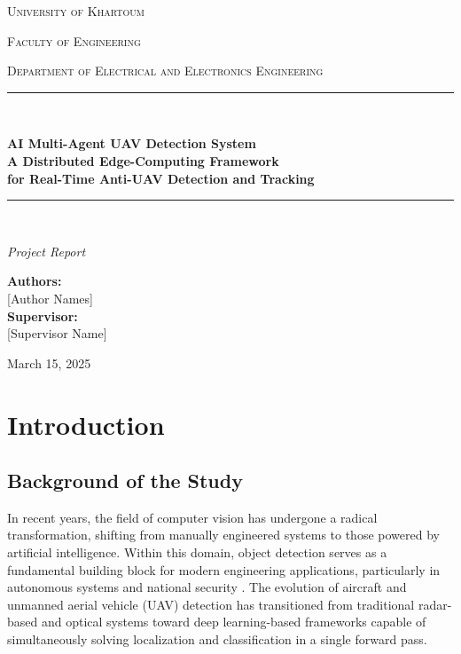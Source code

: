 \documentclass[12pt,a4paper]{report}
\begin{document}
\begin{titlepage}
  \centering
  \vspace*{2cm}
  {\scshape\LARGE University of Khartoum \par}
  \vspace{0.4cm}
  {\scshape\large Faculty of Engineering \par}
  \vspace{0.2cm}
  {\scshape\large Department of Electrical and Electronics Engineering \par}
  \vspace{3cm}
  \rule{\linewidth}{0.5mm}\\[0.4cm]
  {\huge\bfseries AI Multi-Agent UAV Detection System\\[0.4cm]
  A Distributed Edge-Computing Framework\\[0.3cm]
  for Real-Time Anti-UAV Detection and Tracking\par}
  \rule{\linewidth}{0.5mm}\\[1.5cm]
  \vspace{1cm}
  {\Large\itshape Project Report\par}
  \vspace{2cm}
  {\large
    \textbf{Authors:}\\[0.3cm]
    [Author Names]\\[0.5cm]
    \textbf{Supervisor:}\\[0.3cm]
    [Supervisor Name]\\[1cm]
  }
  \vfill
  {\large March 15, 2025\par}
\end{titlepage}

\tableofcontents
\newpage

\chapter{Introduction}

\section{Background of the Study}

In recent years, the field of computer vision has undergone a radical transformation,
shifting from manually engineered systems to those powered by artificial intelligence.
Within this domain, object detection serves as a fundamental building block for modern
engineering applications, particularly in autonomous systems and national security
\cite{zhao2019object}. The evolution of aircraft and unmanned aerial vehicle (UAV)
detection has transitioned from traditional radar-based and optical systems toward
deep learning-based frameworks capable of simultaneously solving localization and
classification in a single forward pass.
\end{document}
